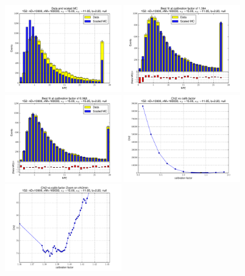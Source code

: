 
 \begin{figure}[htbp] \begin{center} 
\includegraphics[width=0.45\textwidth]{../FIGURES/152/FIG_Data_and_scaled_MC.pdf} 
\includegraphics[width=0.45\textwidth]{../FIGURES/152/FIG_Best_fit_at_calibration_factor_of_1_384.pdf} 
\includegraphics[width=0.45\textwidth]{../FIGURES/152/FIG_Best_fit_at_calibration_factor_of_0_968.pdf} 
\includegraphics[width=0.45\textwidth]{../FIGURES/152/FIG_Chi2_vs_calib_factor.pdf} 
\includegraphics[width=0.45\textwidth]{../FIGURES/152/FIG_Chi2_vs_calib_factor_Zoom_on_chi2min.pdf} 

\end{center}
\end{figure}
